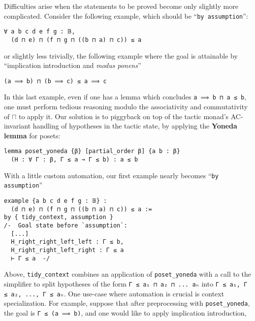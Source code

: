 \documentclass[sigplan,10pt,review, anonymous]{acmart}
\newcommand{\lil}{\lstinline}
\theoremstyle{definition}
\begin{document}
Difficulties arise when the statements to be proved become only slightly more complicated. Consider the following example, which should be  ``\lil{by assumption}'':
\begin{lstlisting}
∀ a b c d e f g : 𝔹,
  (d ⊓ e) ⊓ (f ⊓ g ⊓ ((b ⊓ a) ⊓ c)) ≤ a
\end{lstlisting}
or slightly less trivially, the following example where the goal is attainable by ``implication introduction and \emph{modus ponens}''
\begin{lstlisting}
(a ⟹ b) ⊓ (b ⟹ c) ≤ a ⟹ c
\end{lstlisting}
In this last example, even if one has a lemma which concludes \lil{a ⟹ b ⊓ a ≤ b}, one must perform tedious reasoning modulo the associativity and commutativity of \(\sqcap\) to apply it.
Our solution is to piggyback on top of the tactic monad's AC-invariant handling of hypotheses in the tactic state, by applying the \textbf{Yoneda lemma} for posets:
\label{poset-yoneda}
\begin{lstlisting}
lemma poset_yoneda {β} [partial_order β] {a b : β}
  (H : ∀ Γ : β, Γ ≤ a → Γ ≤ b) : a ≤ b
\end{lstlisting}
With a little custom automation, our first example nearly becomes ``\lil{by assumption}''
\begin{lstlisting}
example {a b c d e f g : 𝔹} :
  (d ⊓ e) ⊓ (f ⊓ g ⊓ ((b ⊓ a) ⊓ c)) ≤ a :=
by { tidy_context, assumption }
/-  Goal state before `assumption`:
  [...]
  H_right_right_left_left : Γ ≤ b,
  H_right_right_left_right : Γ ≤ a
  ⊢ Γ ≤ a  -/
\end{lstlisting}
Above, \lil{tidy_context} combines an application of \lil{poset_yoneda} with a call to the simplifier to split hypotheses of the form \lstinline{Γ ≤ a₁ ⊓ a₂ ⊓ ... aₙ} into \lstinline{Γ ≤ a₁, Γ ≤ a₂, ..., Γ ≤ aₙ}.
One use-case where automation is crucial is context specialization.
For example, suppose that after preprocessing with \lstinline{poset_yoneda}, the goal is \lstinline{Γ ≤ (a ⟹ b)}, and one would like to apply implication introduction,
\end{document}
